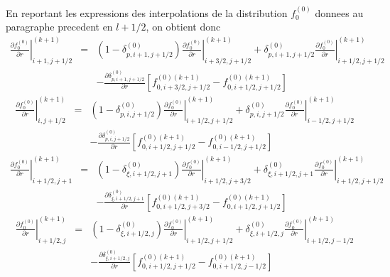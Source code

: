 En reportant les expressions des interpolations de la distribution
$f_{0}^{(0)}$ donnees au paragraphe precedent en $l+1/2$, on obtient
donc \begin{eqnarray*}
\left.\frac{\partial f_{0}^{(0)}}{\partial r}\right|_{i+1,j+1/2}^{(k+1)} & = & \left(1-\delta_{p,i+1,j+1/2}^{(0)}\right)\left.\frac{\partial f_{0}^{(0)}}{\partial r}\right|_{i+3/2,j+1/2}^{(k+1)}+\delta_{p,i+1,j+1/2}^{(0)}\left.\frac{\partial f_{0}^{(0)}}{\partial r}\right|_{i+1/2,j+1/2}^{(k+1)}\\
 &  & -\frac{\partial\delta_{p,i+1,j+1/2}^{(0)}}{\partial r}\left[f_{0,i+3/2,j+1/2}^{\left(0\right)(k+1)}-f_{0,i+1/2,j+1/2}^{\left(0\right)(k+1)}\right]\end{eqnarray*}
\begin{eqnarray*}
\left.\frac{\partial f_{0}^{(0)}}{\partial r}\right|_{i,j+1/2}^{(k+1)} & = & \left(1-\delta_{p,i,j+1/2}^{(0)}\right)\left.\frac{\partial f_{0}^{(0)}}{\partial r}\right|_{i+1/2,j+1/2}^{(k+1)}+\delta_{p,i,j+1/2}^{(0)}\left.\frac{\partial f_{0}^{(0)}}{\partial r}\right|_{i-1/2,j+1/2}^{(k+1)}\\
 &  & -\frac{\partial\delta_{p,i,j+1/2}^{(0)}}{\partial r}\left[f_{0,i+1/2,j+1/2}^{\left(0\right)(k+1)}-f_{0,i-1/2,j+1/2}^{\left(0\right)(k+1)}\right]\end{eqnarray*}
\begin{eqnarray*}
\left.\frac{\partial f_{0}^{(0)}}{\partial r}\right|_{i+1/2,j+1}^{(k+1)} & = & \left(1-\delta_{\xi,i+1/2,j+1}^{(0)}\right)\left.\frac{\partial f_{0}^{(0)}}{\partial r}\right|_{i+1/2,j+3/2}^{(k+1)}+\delta_{\xi,i+1/2,j+1}^{(0)}\left.\frac{\partial f_{0}^{(0)}}{\partial r}\right|_{i+1/2,j+1/2}^{(k+1)}\\
 &  & -\frac{\partial\delta_{\xi,i+1/2,j+1}^{(0)}}{\partial r}\left[f_{0,i+1/2,j+3/2}^{\left(0\right)(k+1)}-f_{0,i+1/2,j+1/2}^{\left(0\right)(k+1)}\right]\end{eqnarray*}
\begin{eqnarray*}
\left.\frac{\partial f_{0}^{(0)}}{\partial r}\right|_{i+1/2,j}^{(k+1)} & = & \left(1-\delta_{\xi,i+1/2,j}^{(0)}\right)\left.\frac{\partial f_{0}^{(0)}}{\partial r}\right|_{i+1/2,j+1/2}^{(k+1)}+\delta_{\xi,i+1/2,j}^{(0)}\left.\frac{\partial f_{0}^{(0)}}{\partial r}\right|_{i+1/2,j-1/2}^{(k+1)}\\
 &  & -\frac{\partial\delta_{\xi,i+1/2,j}^{(0)}}{\partial r}\left[f_{0,i+1/2,j+1/2}^{\left(0\right)(k+1)}-f_{0,i+1/2,j-1/2}^{\left(0\right)(k+1)}\right]\end{eqnarray*}


